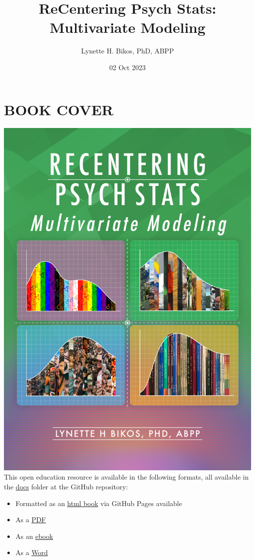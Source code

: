 \documentclass[
  11pt,
]{book}
\title{ReCentering Psych Stats: Multivariate Modeling}
\author{Lynette H. Bikos, PhD, ABPP}
\date{02 Oct 2023}
\providecommand{\tightlist}{%
  \setlength{\itemsep}{0pt}\setlength{\parskip}{0pt}}
\begin{document}
\maketitle

{
\hypersetup{linkcolor=}
\setcounter{tocdepth}{3}
\tableofcontents
}
\hypertarget{book-cover}{%
\chapter*{BOOK COVER}\label{book-cover}}


\includegraphics{images/ReC_multivariate_bkcvr.png} This open education resource is available in the following formats, all available in the \href{https://github.com/lhbikos/ReC_MultivModel/tree/main/docs}{docs} folder at the GitHub repository:

\begin{itemize}
\tightlist
\item
  Formatted as an \href{https://lhbikos.github.io/ReC_MultivModel/}{html book} via GitHub Pages available
\item
  As a \href{https://github.com/lhbikos/ReC_MultivModel/blob/main/docs/ReC_MultMod.pdf}{PDF}
\item
  As an \href{https://github.com/lhbikos/ReC_MultivModel/blob/main/docs/ReC_MultMod.epub}{ebook}
\item
  As a \href{https://github.com/lhbikos/ReC_MultivModel/blob/main/docs/ReC_MultMod.docx}{Word}
\end{itemize}
\end{document}
